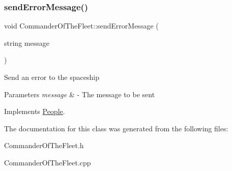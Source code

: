 \mbox{\label{classCommanderOfTheFleet_a39cfd5c0016355543515e919791d7984}} 
\subsubsection{\texorpdfstring{send\+Error\+Message()}{sendErrorMessage()}}
{\footnotesize\ttfamily void Commander\+Of\+The\+Fleet\+::send\+Error\+Message (\begin{DoxyParamCaption}\item[{string}]{message }\end{DoxyParamCaption})\hspace{0.3cm}{\ttfamily [virtual]}}

Send an error to the spaceship 
\begin{DoxyParams}{Parameters}
{\em message} & -\/ The message to be sent \\
\hline
\end{DoxyParams}


Implements \hyperlink{classPeople_a572a35170f61d1848eb04b65baafb057}{People}.



The documentation for this class was generated from the following files\+:\begin{DoxyCompactItemize}
\item 
Commander\+Of\+The\+Fleet.\+h\item 
Commander\+Of\+The\+Fleet.\+cpp\end{DoxyCompactItemize}
